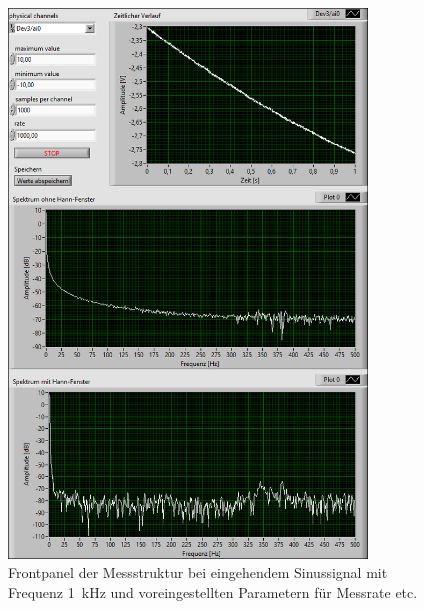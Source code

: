 		\begin{figure}[H]
			\centering
			\includegraphics[width=0.85\textwidth]{pic/abtast_1kHz.png}	
			\caption{Frontpanel der Messstruktur bei eingehendem Sinussignal mit Frequenz \SI{1}{\kilo\hertz} und voreingestellten Parametern für Messrate etc.}
			\label{fig:abtast_1kHz}
		\end{figure}
		
